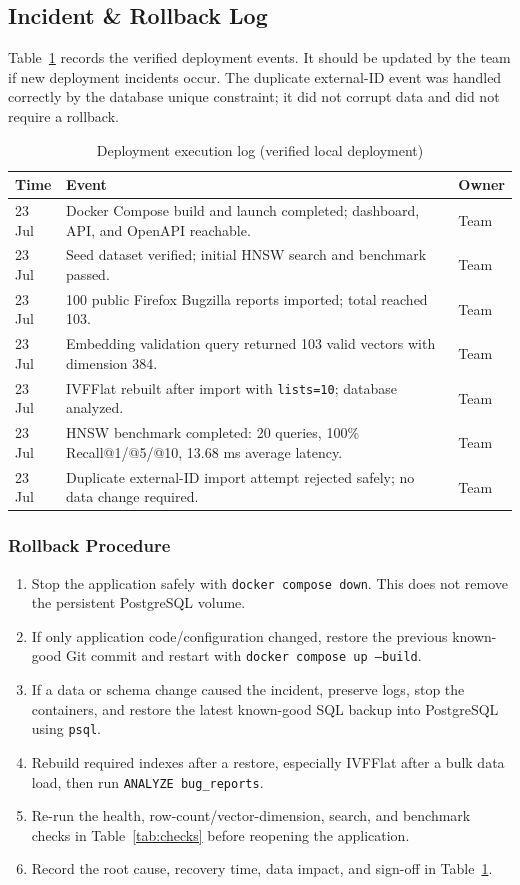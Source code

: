 \documentclass[conference]{IEEEtran}
\begin{document}
\subsection{Incident \& Rollback Log}
Table~\ref{tab:log} records the verified deployment events. It should be updated by the team if new deployment incidents occur. The duplicate external-ID event was handled correctly by the database unique constraint; it did not corrupt data and did not require a rollback.

\begin{table}[!t]
\caption{Deployment execution log (verified local deployment)}
\label{tab:log}
\centering
\begin{tabular}{p{}p{}p{}}
\toprule
\textbf{Time} & \textbf{Event} & \textbf{Owner}\\
\midrule
23 Jul & Docker Compose build and launch completed; dashboard, API, and OpenAPI reachable. & Team\\
23 Jul & Seed dataset verified; initial HNSW search and benchmark passed. & Team\\
23 Jul & 100 public Firefox Bugzilla reports imported; total reached 103. & Team\\
23 Jul & Embedding validation query returned 103 valid vectors with dimension 384. & Team\\
23 Jul & IVFFlat rebuilt after import with \texttt{lists=10}; database analyzed. & Team\\
23 Jul & HNSW benchmark completed: 20 queries, 100\% Recall@1/@5/@10, 13.68 ms average latency. & Team\\
23 Jul & Duplicate external-ID import attempt rejected safely; no data change required. & Team\\
\bottomrule
\end{tabular}
\end{table}

\subsubsection{Rollback Procedure}
\begin{enumerate}
\item Stop the application safely with \texttt{docker compose down}. This does not remove the persistent PostgreSQL volume.
\item If only application code/configuration changed, restore the previous known-good Git commit and restart with \texttt{docker compose up --build}.
\item If a data or schema change caused the incident, preserve logs, stop the containers, and restore the latest known-good SQL backup into PostgreSQL using \texttt{psql}.
\item Rebuild required indexes after a restore, especially IVFFlat after a bulk data load, then run \texttt{ANALYZE bug\_reports}.
\item Re-run the health, row-count/vector-dimension, search, and benchmark checks in Table~\ref{tab:checks} before reopening the application.
\item Record the root cause, recovery time, data impact, and sign-off in Table~\ref{tab:log}.
\end{enumerate}
\end{document}
